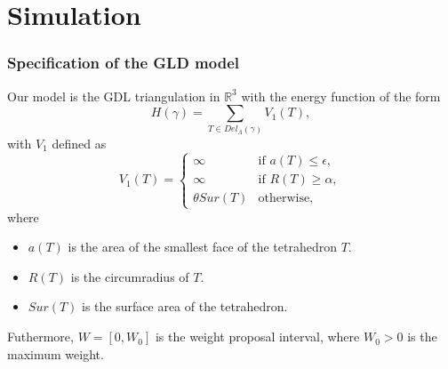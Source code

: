 \documentclass[c, 10pt]{beamer}
\begin{document}
\section{Simulation}
\framesection{}




\begin{frame}\frametitle{Specification of the GLD model}
Our model is the GDL triangulation in $\mathbb R^3$ with  the energy function of the form
$$H(\gamma)= \sum_{T \in Del_\Lambda(\gamma)} V_1(T),$$ 
with $V_1$ defined as
\begin{equation}
V_1(T) = 
\left\{
    \begin{array}{ll}
        \infty & \mbox{if } a(T)\leq \epsilon, \\
        \infty & \mbox{if } R(T)\geq \alpha, \\
        \theta Sur(T) & \mbox{otherwise, }
    \end{array}
\right. 
\end{equation}
where
\begin{itemize}
\item $a(T)$ is the area of the smallest face of the tetrahedron $T$.
\item $R(T)$ is the circumradius of $T$.
\item $Sur(T)$ is the surface area of the tetrahedron.
\end{itemize}

Futhermore, $W = [0,W_0]$ is the weight proposal interval, where $W_0>0$ is the maximum weight.

\end{frame}
\end{document}
